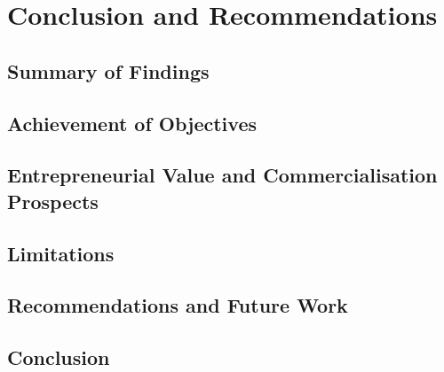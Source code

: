 \chapter{Conclusion and Recommendations}

\section{Summary of Findings}

\section{Achievement of Objectives}

\section{Entrepreneurial Value and Commercialisation Prospects}

\section{Limitations}

\section{Recommendations and Future Work}

\section{Conclusion}
